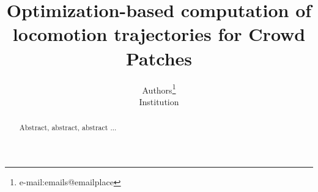 \documentclass[conference]{acmsiggraph}
\title{Optimization-based computation of locomotion trajectories for Crowd Patches}
\author{Authors\thanks{e-mail:emails@emailplace}\\Institution}
\begin{document}

\maketitle

\begin{abstract}

Abstract, abstract, abstract ...


\end{abstract}

\begin{CRcatlist}
\end{CRcatlist}

\keywordlist


\TOGlinkslist


\copyrightspace








 










\end{document}
